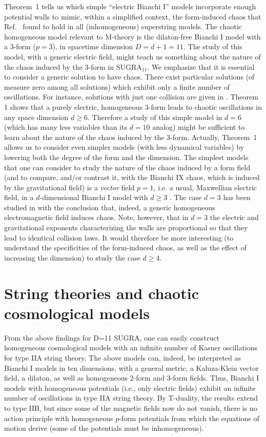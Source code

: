 \documentclass[a4paper,12pt]{article}
\begin{document}
Theorem~1 tells us which simple ``electric Bianchi I'' models 
incorporate enough potential walls to mimic, within a simplified 
context, the form-induced chaos that Ref.~\cite{dh1} found to hold in 
all (inhomogeneous) superstring models. The chaotic 
homogeneous model relevant to M-theory
is the dilaton-free Bianchi I model with a 3-form ($p=3$), 
in spacetime dimension $D = d+1 = 11$. The study of this model, with
a generic electric field,  might teach 
us something about the nature of the chaos induced by the 3-form in 
SUGRA$_{11}$. We
emphasize that it is essential to consider a generic solution to have
chaos. There exist particular solutions (of measure zero among all
solutions) which exhibit only a finite number of oscillations.  For instance,
solutions with just one collision are given in \cite{Demaretetal}.
Theorem 1 shows  that a purely electric,
homogeneous 3-form leads to chaotic oscillations in any space dimension 
$d \geq 6$. Therefore a study of this simple model  in $d=6$ 
(which has many less variables than its $d=10$ analog) might be 
sufficient to learn about the nature of the chaos induced by the 
3-form. Actually, Theorem~1 allows us to consider even simpler models 
(with less dynamical variables) by lowering both the degree of the form and the
dimension. The simplest models that one can consider
to study the nature of the chaos induced by a form field (and to 
compare, and/or contrast it, with the Bianchi IX chaos, which is 
induced by the gravitational field) is 
 a {\it vector} field $p=1$, i.e. a usual, Maxwellian 
electric field, in a $d$-dimensional Bianchi I model with $d \geq 3$ \cite{BK81}. 
The case $d=3$ has been studied in \cite{Jantzen,Leblanc,Weaver} with the conclusion
that, indeed, a generic homogeneous electromagnetic field induces chaos.
Note, however, that in $d=3$  the electric and
gravitational exponents characterizing the walls are proportional
so that they lead to identical collision laws. It would therefore be more
interesting (to understand the specificities of the form-induced chaos, as
well as the effect of increasing the dimension)
 to study the case $ d \geq 4$. 

\section{String theories and chaotic cosmological models}

{}From the above findings for D=11 SUGRA, one can easily 
construct homogeneous cosmological models with an
infinite number of Kasner oscillations for type IIA string
theory.  The above models can, indeed, be interpreted
as Bianchi I models in ten dimensions, with a general
metric, a Kaluza-Klein vector field, a dilaton, as well as
homogeneous 2-form and 3-form fields.  Thus, Bianchi I
models with homogeneous potentials (i.e., only electric fields) 
exhibit an infinite number of oscillations in type IIA string theory.
By T-duality, the results extend to type IIB, but since some of the
magnetic fields now do not vanish, there is no
action principle with homogeneous $p$-form potentials
from which the equations of motion derive (some of the potentials
must be inhomogeneous).
\end{document}
